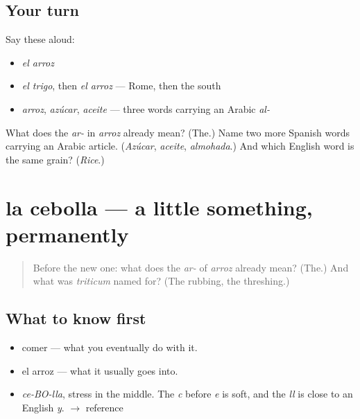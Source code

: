 \subsection*{Your turn}
Say these aloud:

\begin{itemize}
\raggedright
  \item \emph{el arroz}
  \item \emph{el trigo}, then \emph{el arroz} — Rome, then the south
  \item \emph{arroz}, \emph{azúcar}, \emph{aceite} — three words carrying an Arabic \emph{al-}
\end{itemize}

\begin{tcolorbox}[breakable,colback=teal!4,colframe=teal!35!black,title={Before you move on}]
What does the \emph{ar-} in \emph{arroz} already mean? (The.) Name two more Spanish words carrying an Arabic article. (\emph{Azúcar}, \emph{aceite}, \emph{almohada}.) And which English word is the same grain? (\emph{Rice}.)
\end{tcolorbox}
\section[la cebolla]{la cebolla — a little something, permanently}

\label{lesson:ES-C290-cebolla}



\begin{quote}
Before the new one: what does the \emph{ar-} of \emph{arroz} already mean? (The.) And what was \emph{triticum} named for? (The rubbing, the threshing.)
\end{quote}

\subsection*{What to know first}
\begin{itemize}
\raggedright
  \item comer — what you eventually do with it.
  \item el arroz — what it usually goes into.
\end{itemize}

\begin{sounds}
\begin{itemize}
\raggedright
  \item \emph{ce-BO-lla}, stress in the middle. The \emph{c} before \emph{e} is soft, and the \emph{ll} is close to an English \emph{y}. $\to$ reference
\end{itemize}
\end{sounds}

